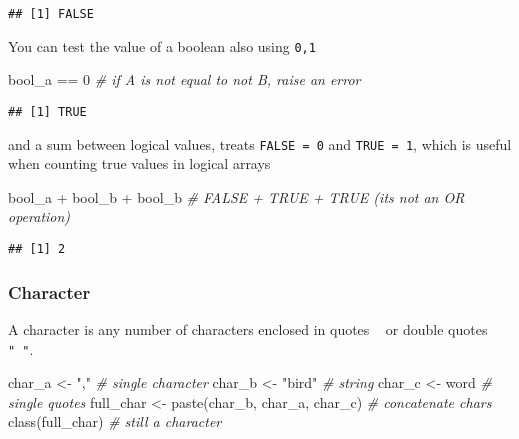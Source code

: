 \documentclass[
  oneside]{book}
\newenvironment{Shaded}{\begin{snugshade}}{\end{snugshade}}
\newcommand{\CommentTok}[1]{\textcolor[rgb]{0.56,0.35,0.01}{\textit{#1}}}
\newcommand{\DecValTok}[1]{\textcolor[rgb]{0.00,0.00,0.81}{#1}}
\newcommand{\FunctionTok}[1]{\textcolor[rgb]{0.00,0.00,0.00}{#1}}
\newcommand{\NormalTok}[1]{#1}
\newcommand{\OtherTok}[1]{\textcolor[rgb]{0.56,0.35,0.01}{#1}}
\newcommand{\SpecialCharTok}[1]{\textcolor[rgb]{0.00,0.00,0.00}{#1}}
\newcommand{\StringTok}[1]{\textcolor[rgb]{0.31,0.60,0.02}{#1}}
\begin{document}
\begin{verbatim}
## [1] FALSE
\end{verbatim}

You can test the value of a boolean also using \texttt{0,1}

\begin{Shaded}
\begin{Highlighting}[]
\NormalTok{bool\_a }\SpecialCharTok{==} \DecValTok{0} \CommentTok{\# if \textquotesingle{}A\textquotesingle{} is not equal to \textquotesingle{}not B\textquotesingle{}, raise an error}
\end{Highlighting}
\end{Shaded}

\begin{verbatim}
## [1] TRUE
\end{verbatim}

and a sum between logical values, treats \texttt{FALSE\ =\ 0} and \texttt{TRUE\ =\ 1},
which is useful when counting true values in logical arrays

\begin{Shaded}
\begin{Highlighting}[]
\NormalTok{bool\_a }\SpecialCharTok{+}\NormalTok{ bool\_b }\SpecialCharTok{+}\NormalTok{ bool\_b }\CommentTok{\# FALSE + TRUE + TRUE (it\textquotesingle{}s not an OR operation)}
\end{Highlighting}
\end{Shaded}

\begin{verbatim}
## [1] 2
\end{verbatim}

\hypertarget{character}{%
\subsubsection{Character}\label{character}}

A character is any number of characters enclosed in quotes \texttt{\textquotesingle{}\ \textquotesingle{}} or double
quotes \texttt{"\ "}.

\begin{Shaded}
\begin{Highlighting}[]
\NormalTok{char\_a }\OtherTok{\textless{}{-}} \StringTok{","} \CommentTok{\# single character}
\NormalTok{char\_b }\OtherTok{\textless{}{-}} \StringTok{"bird"} \CommentTok{\# string}
\NormalTok{char\_c }\OtherTok{\textless{}{-}} \StringTok{\textquotesingle{}word\textquotesingle{}} \CommentTok{\# single quotes}
\NormalTok{full\_char }\OtherTok{\textless{}{-}} \FunctionTok{paste}\NormalTok{(char\_b, char\_a, char\_c) }\CommentTok{\# concatenate chars}
\FunctionTok{class}\NormalTok{(full\_char) }\CommentTok{\# still a character}
\end{Highlighting}
\end{Shaded}
\end{document}
